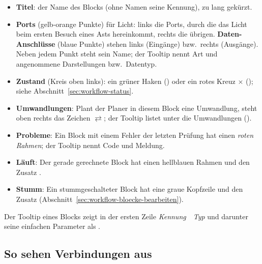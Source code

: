 \begin{itemize}
  \item \textbf{Titel}: der Name des Blocks (ohne Namen seine Kennung), zu lang gekürzt.
  \item \textbf{Ports} (gelb-orange Punkte) für Licht: links die Ports, durch die das Licht beim
        ersten Besuch eines Asts hereinkommt, rechts die übrigen. \textbf{Daten-Anschlüsse}
        (blaue Punkte) stehen links (Eingänge) bzw.\ rechts (Ausgänge). Neben jedem Punkt steht
        sein Name; der Tooltip nennt Art und angenommene Darstellungen bzw.\ Datentyp.
  \item \textbf{Zustand} (Kreis oben links): ein grüner Haken \checkmark{} () oder ein rotes Kreuz $\times$ (); siehe Abschnitt~\ref{sec:workflow-status}.
  \item \textbf{Umwandlungen}: Plant der Planer in diesem Block eine Umwandlung, steht oben
        rechts das Zeichen $\rightleftarrows$; der Tooltip listet unter 
        die Umwandlungen ().
  \item \textbf{Probleme}: Ein Block mit einem Fehler der letzten Prüfung hat einen
        \emph{roten Rahmen}; der Tooltip nennt Code und Meldung.
  \item \textbf{Läuft}: Der gerade gerechnete Block hat einen hellblauen Rahmen und den Zusatz
        .
  \item \textbf{Stumm}: Ein stummgeschalteter Block hat eine graue Kopfzeile und den Zusatz
         (Abschnitt~\ref{sec:workflow-bloecke-bearbeiten}).
\end{itemize}

Der Tooltip eines Blocks zeigt in der ersten Zeile \textit{Kennung}~~\textit{Typ} und
darunter seine einfachen Parameter als .

\subsection{So sehen Verbindungen aus}

